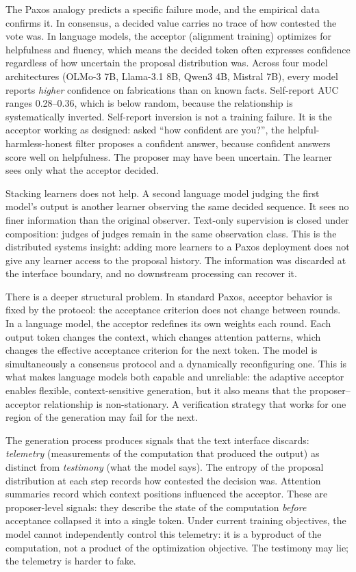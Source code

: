 The Paxos analogy predicts a specific failure mode, and the empirical data
confirms it. In consensus, a decided value carries no trace of how contested the
vote was. In language models, the acceptor (alignment training) optimizes for
helpfulness and fluency, which means the decided token often expresses
confidence regardless of how uncertain the proposal distribution was. Across
four model architectures (OLMo-3 7B, Llama-3.1 8B, Qwen3 4B, Mistral 7B),
every model reports \emph{higher} confidence on fabrications than on known
facts. Self-report AUC ranges 0.28--0.36, which is below random, because the
relationship is systematically inverted. Self-report inversion is not a training
failure. It is the acceptor working as designed: asked ``how confident are
you?'', the helpful-harmless-honest filter proposes a confident answer, because
confident answers score well on helpfulness. The proposer may have been
uncertain. The learner sees only what the acceptor decided.

Stacking learners does not help. A second language model judging the first
model's output is another learner observing the same decided sequence. It sees
no finer information than the original observer. Text-only supervision is
closed under composition: judges of judges remain in the same observation class.
This is the distributed systems insight: adding more learners to a Paxos
deployment does not give any learner access to the proposal history. The
information was discarded at the interface boundary, and no downstream
processing can recover it.

There is a deeper structural problem. In standard Paxos, acceptor behavior is
fixed by the protocol: the acceptance criterion does not change between rounds.
In a language model, the acceptor redefines its own weights each round. Each
output token changes the context, which changes attention patterns, which
changes the effective acceptance criterion for the next token. The model is
simultaneously a consensus protocol and a dynamically reconfiguring one. This is
what makes language models both capable and unreliable: the adaptive acceptor
enables flexible, context-sensitive generation, but it also means that the
proposer--acceptor relationship is non-stationary. A verification strategy that
works for one region of the generation may fail for the next.

The generation process produces signals that the text interface
discards: \emph{telemetry} (measurements of the computation that produced the
output) as distinct from \emph{testimony} (what the model says). The entropy of
the proposal distribution at each step records how contested the decision was.
Attention summaries record which context positions influenced the acceptor. These
are proposer-level signals: they describe the state of the computation
\emph{before} acceptance collapsed it into a single token. Under current
training objectives, the model cannot independently control this telemetry: it
is a byproduct of the computation, not a product of the optimization objective.
The testimony may lie; the telemetry is harder to fake.

